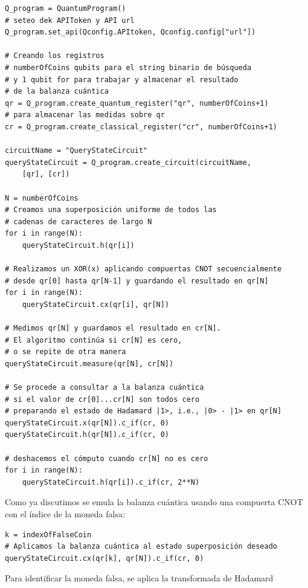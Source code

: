 \documentclass{article}
\begin{document}
\begin{verbatim}
Q_program = QuantumProgram()
# seteo dek APIToken y API url
Q_program.set_api(Qconfig.APItoken, Qconfig.config["url"]) 

# Creando los registros
# numberOfCoins qubits para el string binario de búsqueda
# y 1 qubit for para trabajar y almacenar el resultado 
# de la balanza cuántica
qr = Q_program.create_quantum_register("qr", numberOfCoins+1)
# para almacenar las medidas sobre qr
cr = Q_program.create_classical_register("cr", numberOfCoins+1)

circuitName = "QueryStateCircuit"
queryStateCircuit = Q_program.create_circuit(circuitName,
    [qr], [cr])

N = numberOfCoins
# Creamos una superposición uniforme de todos las 
# cadenas de caracteres de largo N
for i in range(N):
    queryStateCircuit.h(qr[i])

# Realizamos un XOR(x) aplicando compuertas CNOT secuencialmente 
# desde qr[0] hasta qr[N-1] y guardando el resultado en qr[N]
for i in range(N):
    queryStateCircuit.cx(qr[i], qr[N])

# Medimos qr[N] y guardamos el resultado en cr[N]. 
# El algoritmo continúa si cr[N] es cero,
# o se repite de otra manera
queryStateCircuit.measure(qr[N], cr[N])

# Se procede a consultar a la balanza cuántica 
# si el valor de cr[0]...cr[N] son todos cero
# preparando el estado de Hadamard |1>, i.e., |0> - |1> en qr[N]
queryStateCircuit.x(qr[N]).c_if(cr, 0)
queryStateCircuit.h(qr[N]).c_if(cr, 0)

# deshacemos el cómputo cuando cr[N] no es cero
for i in range(N):
    queryStateCircuit.h(qr[i]).c_if(cr, 2**N)

\end{verbatim}




Como ya discutimos se emula la balanza cuántica usando una compuerta CNOT con el índice de la moneda falsa:

\begin{verbatim}
k = indexOfFalseCoin
# Aplicamos la balanza cuántica al estado superposición deseado
queryStateCircuit.cx(qr[k], qr[N]).c_if(cr, 0)
\end{verbatim}


Para identificar la moneda falsa, se aplica la transformada de Hadamard
\end{document}
